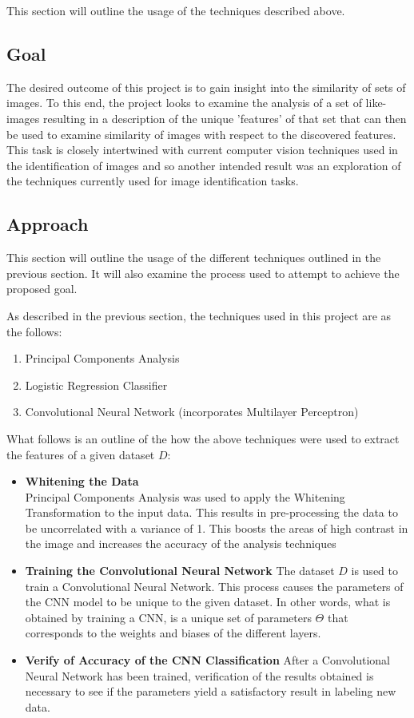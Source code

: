 \documentclass{article}
\begin{document}
This section will outline the usage of the techniques described above.

\subsection{Goal}

The desired outcome of this project is to gain insight into the similarity of sets of images. To this end, the project
looks to examine the analysis of a set of like-images resulting in a description of the unique 'features' of that set that
can then be used to examine similarity of images with respect to the discovered features. This task is closely intertwined
with current computer vision techniques used in the identification of images and so another intended result was an exploration
of the techniques currently used for image identification tasks.
  
\subsection{Approach}

This section will outline the usage of the different techniques outlined in the previous section. It will also examine the
process used to attempt to achieve the proposed goal.

As described in the previous section, the techniques used in this project are as the follows:
\begin{enumerate}
  \item Principal Components Analysis
  \item Logistic Regression Classifier
  \item Convolutional Neural Network (incorporates Multilayer Perceptron)
\end{enumerate}

What follows is an outline of the how the above techniques were used to extract the features of a given dataset $D$:
\begin{itemize}
  \item \textbf{Whitening the Data} \\
        Principal Components Analysis was used to apply the Whitening Transformation to the input data. This results in
        pre-processing the data to be uncorrelated with a variance of 1. This boosts the areas of high contrast in the image
        and increases the accuracy of the analysis techniques

  \item \textbf{Training the Convolutional Neural Network}
  		The dataset $D$ is used to train a Convolutional Neural Network. This process causes the parameters of the CNN model
  		to be unique to the given dataset. In other words, what is obtained by training a CNN, is a unique set of parameters
  		$\Theta$ that corresponds to the weights and biases of the different layers.
  		
  \item \textbf{Verify of Accuracy of the CNN Classification}
  		After a Convolutional Neural Network has been trained, verification of the results obtained is necessary to see if the
  		parameters yield a satisfactory result in labeling new data. 
\end{itemize}
\end{document}
